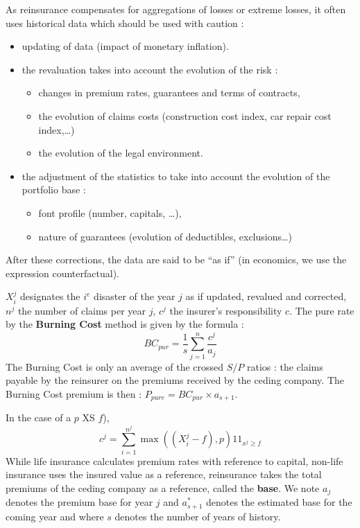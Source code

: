 \begin{f}

As reinsurance compensates for aggregations of losses or extreme losses, it often uses historical data which should be used with caution :
\begin{itemize}
	\item updating of data (impact of monetary inflation).
	\item the revaluation takes into account the evolution of the risk :
	\begin{itemize}
		\item changes in premium rates, guarantees and terms of contracts,
		\item the evolution of claims costs (construction cost index, car repair cost index,\ldots)
		\item the evolution of the legal environment.
	\end{itemize}
	\item the adjustment of the statistics to take into account the evolution of the portfolio base :
	\begin{itemize}
		\item font profile (number, capitals, \ldots),
		\item nature of guarantees (evolution of deductibles, exclusions\ldots)
	\end{itemize}
\end{itemize}
After these corrections, the data are said to be \enquote{as if} (in economics, we use the expression counterfactual).

\end{f}


\begin{f}
	
	\(X_{i}^{j}\) designates the \(i^{e}\) disaster of the year \(j\) as if updated, revalued and corrected,
\(n^j\) the number of claims per year \(j\), \(c^{j}\) the insurer's responsibility \(c\).
The pure rate by the \textbf{Burning Cost} method is given by the formula :
\[
BC_{pur}=\frac{1}{s}\sum_{j=1}^{n}\frac{c^{j}}{a_{j}}
\] 
The Burning Cost is only an average of the crossed \(S/P\) ratios : the claims payable by the reinsurer on the premiums received by the ceding company.
The Burning Cost premium is then : \(P_{pure}=BC_{pur}\times a_{s+1}\).

In the case of a \(p\) XS \(f\)), \[
c^{j}=\sum_{i=1}^{n^j}\max\left(  \left( X_{i}^{j}-f\right),p\right) 1\!\!1_{x^{j}\geq f}
\]
While life insurance calculates premium rates with reference to capital, non-life insurance uses the insured value as a reference, reinsurance takes the total premiums of the ceding company as a reference, called the \textbf{base}.
We note \(a_{j}\) denotes the premium base for year \(j\) and \(a_{s+1}^{*}\) denotes the estimated base for the coming year and where \(s\) denotes the number of years of history.
\end{f}



